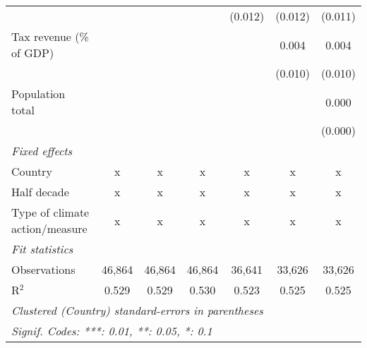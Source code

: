 \begin{tabular}{lcccccc}
                                                        &         &              &              & (0.012)        & (0.012)        & (0.011)\\   
   Tax revenue (\% of GDP)                              &         &              &              &                & 0.004          & 0.004\\   
                                                        &         &              &              &                & (0.010)        & (0.010)\\   
   Population total                                     &         &              &              &                &                & 0.000\\   
                                                        &         &              &              &                &                & (0.000)\\   
   \emph{Fixed effects}\\
   Country                                              & x       & x            & x            & x              & x              & x\\  
   Half decade                                          & x       & x            & x            & x              & x              & x\\  
   Type of climate action/measure                       & x       & x            & x            & x              & x              & x\\  
   \midrule \emph{Fit statistics}\\
   Observations                                         & 46,864  & 46,864       & 46,864       & 36,641         & 33,626         & 33,626\\  
   R$^2$                                                & 0.529   & 0.529        & 0.530        & 0.523          & 0.525          & 0.525\\  
   \midrule
   \multicolumn{7}{l}{\emph{Clustered (Country) standard-errors in parentheses}}\\
   \multicolumn{7}{l}{\emph{Signif. Codes: ***: 0.01, **: 0.05, *: 0.1}}\\
\end{tabular}
\par\endgroup


